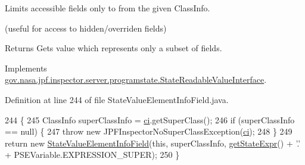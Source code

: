 Limits accessible fields only to from the given Class\+Info. 

(useful for access to hidden/overriden fields)

\begin{DoxyReturn}{Returns}
Gets value which represents only a subset of fields. 
\end{DoxyReturn}


Implements \hyperlink{interfacegov_1_1nasa_1_1jpf_1_1inspector_1_1server_1_1programstate_1_1_state_readable_value_interface_a299f20e9db1151e4fdbe870583743799}{gov.\+nasa.\+jpf.\+inspector.\+server.\+programstate.\+State\+Readable\+Value\+Interface}.



Definition at line 244 of file State\+Value\+Element\+Info\+Field.\+java.


\begin{DoxyCode}
244                                                                                 \{
245     ClassInfo superClassInfo = \hyperlink{classgov_1_1nasa_1_1jpf_1_1inspector_1_1server_1_1programstate_1_1_state_value_a0eb4aa1e630ed6372dcfb8c41ae7edc5}{ci}.getSuperClass();
246     \textcolor{keywordflow}{if} (superClassInfo == null) \{
247       \textcolor{keywordflow}{throw} \textcolor{keyword}{new} JPFInspectorNoSuperClassException(\hyperlink{classgov_1_1nasa_1_1jpf_1_1inspector_1_1server_1_1programstate_1_1_state_value_a0eb4aa1e630ed6372dcfb8c41ae7edc5}{ci});
248     \}
249     \textcolor{keywordflow}{return} \textcolor{keyword}{new} \hyperlink{classgov_1_1nasa_1_1jpf_1_1inspector_1_1server_1_1programstate_1_1_state_value_element_info_field_ac65dc79fdf2ab5be6383c21430dd1a90}{StateValueElementInfoField}(\textcolor{keyword}{this}, superClassInfo, 
      \hyperlink{classgov_1_1nasa_1_1jpf_1_1inspector_1_1server_1_1programstate_1_1_state_node_a54c1c8d91f93c078171589f844252bdf}{getStateExpr}() + \textcolor{charliteral}{'.'} + PSEVariable.EXPRESSION\_SUPER);
250   \}
\end{DoxyCode}
